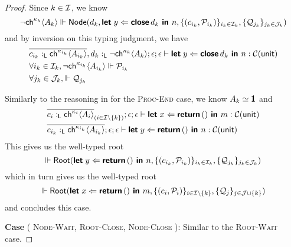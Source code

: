 \begin{proof}
  \noindent
  Since $k \in \mathcal{I}$, we know 
  $$
    \neg{\textsf{ch}^{\kappa_k}\langle{A_k}\rangle} \Vdash 
    \textsf{Node}({d_k}, {\textbf{\textsf{let}}\;{y}\Leftarrow{\textbf{\textsf{close}}\,{d_k}}\textbf{\textsf{ in }}{n}}, { 
      \{ ( c_{i_k}, \mathcal{P}_{i_k} ) \}_{i_k \in \mathcal{I}_k},
      \{ \mathcal{Q}_{j_k} \}_{j_k \in \mathcal{J}_k}
    })
  $$
  and by inversion on this typing judgment, we have
  \begin{align*}
    & \overline{c_{i_k} :_{\textsf{L}} \textsf{ch}^{\kappa_{i_k}}\langle{A_{i_k}}\rangle}, d_k :_{\textsf{L}} \neg{\textsf{ch}^{\kappa_k}\langle{A_k}\rangle} ; 
      \epsilon ; \epsilon \vdash
      \textbf{\textsf{let}}\;{y}\Leftarrow{\textbf{\textsf{close}}\,{d_k}}\textbf{\textsf{ in }}{n} : 
      \mathcal{C}({\textsf{unit}}) \\
    & \forall i_k \in \mathcal{I}_k, \neg{\textsf{ch}^{\kappa_{i_k}}\langle{A_{i_k}}\rangle} \Vdash \mathcal{P}_{i_k} \\
    & \forall j_k \in \mathcal{J}_k, \Vdash \mathcal{Q}_{j_k}
  \end{align*}
  
  \noindent
  Similarly to the reasoning in  for the \textsc{Proc-End} case,
  we know $A_k \simeq \textbf{\textsf{1}}$ and
  \begin{align*}
    & \overline{c_i :_{\textsf{L}} \textsf{ch}^{\kappa_i}\langle{A_i}\rangle}_{(i \in \mathcal{I} \setminus \{k\})} ; 
      \epsilon ; \epsilon \vdash \textbf{\textsf{let}}\;{x}\Leftarrow{\textbf{\textsf{return}}\,{{()}}}\textbf{\textsf{ in }}{m} : \mathcal{C}({\textsf{unit}}) \\
    & \overline{c_{i_k} :_{\textsf{L}} \textsf{ch}^{\kappa_{i_k}}\langle{A_{i_k}}\rangle} ; 
      \epsilon ; \epsilon \vdash \textbf{\textsf{let}}\;{y}\Leftarrow{\textbf{\textsf{return}}\,{{()}}}\textbf{\textsf{ in }}{n} : \mathcal{C}({\textsf{unit}}) 
  \end{align*}
  This gives us the well-typed root
  $$
    \Vdash \textsf{Root}({
      \textbf{\textsf{let}}\;{y}\Leftarrow{\textbf{\textsf{return}}\,{{()}}}\textbf{\textsf{ in }}{n}
    }, { 
      \{ ( c_{i_k}, \mathcal{P}_{i_k} ) \}_{i_k \in \mathcal{I}_k},
      \{ \mathcal{Q}_{j_k} \}_{j_k \in \mathcal{J}_k}
    })
  $$
  which in turn gives us the well-typed root
  $$
    \Vdash \textsf{Root}({
      \textbf{\textsf{let}}\;{x}\Leftarrow{\textbf{\textsf{return}}\,{{()}}}\textbf{\textsf{ in }}{m}
    }, { 
      \{ ( c_i, \mathcal{P}_i ) \}_{i \in \mathcal{I} \setminus \{k\}},
      \{ \mathcal{Q}_j \}_{j \in \mathcal{J} \cup \{k\}}
    })
  $$
  and concludes this case.

\noindent
\textbf{Case} (
  \textsc{Node-Wait}, 
  \textsc{Root-Close}, 
  \textsc{Node-Close}
): Similar to the \textsc{Root-Wait} case.


\end{proof}
